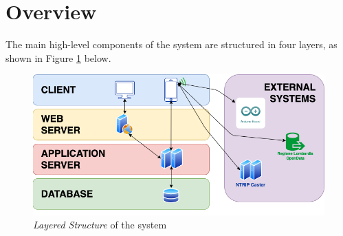 \section{Overview}
The main high-level components of the system are structured in four layers, as shown in Figure \ref{img:archi_layers} below.

\begin{figure}[H]
\begin{center}
  \includegraphics[width=\textwidth]{img/archi/layers.png}
  \hspace{0.05\linewidth}
  \centering
  \caption{\textit{Layered Structure} of the system}
  \label{img:archi_layers}
\end{center}
\end{figure}
\clearpage

